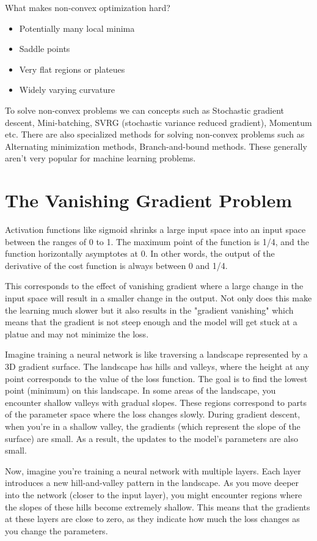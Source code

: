 \documentclass{report}
\begin{document}
What makes non-convex optimization hard?
\begin{itemize}
	\item Potentially many local minima
	\item Saddle points
	\item Very flat regions or plateues
	\item Widely varying curvature
\end{itemize}

To solve non-convex problems we can concepts such as Stochastic gradient descent, Mini-batching, SVRG (stochastic variance reduced gradient), Momentum etc. There are also specialized methods for solving non-convex problems such as Alternating minimization methods, Branch-and-bound methods. These generally aren’t very popular for machine learning problems.


\section{The Vanishing Gradient Problem}
Activation functions like sigmoid shrinks a large input space into an input space between the ranges of 0 to 1. The maximum point of the function is 1/4, and the function horizontally asymptotes at 0. In other words, the output of the derivative of the cost function is always between 0 and 1/4. 

This corresponds to the effect of vanishing gradient where a large change in the input space will result in a smaller change in the output. Not only does this make the learning much slower but it also results in the "gradient vanishing" which means that the gradient is not steep enough and the model will get stuck at a platue and may not minimize the loss.

Imagine training a neural network is like traversing a landscape represented by a 3D gradient surface. The landscape has hills and valleys, where the height at any point corresponds to the value of the loss function. The goal is to find the lowest point (minimum) on this landscape. In some areas of the landscape, you encounter shallow valleys with gradual slopes. These regions correspond to parts of the parameter space where the loss changes slowly. During gradient descent, when you're in a shallow valley, the gradients (which represent the slope of the surface) are small. As a result, the updates to the model's parameters are also small. 

Now, imagine you're training a neural network with multiple layers. Each layer introduces a new hill-and-valley pattern in the landscape. As you move deeper into the network (closer to the input layer), you might encounter regions where the slopes of these hills become extremely shallow. This means that the gradients at these layers are close to zero, as they indicate how much the loss changes as you change the parameters.
\end{document}
